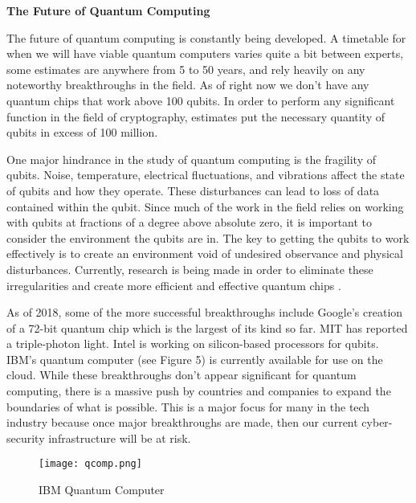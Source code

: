 \documentclass[12pt]{article}
\begin{document}
	\par\vspace{1mm}
	
\begin{center}
	{\large \bf The Future of Quantum Computing}
\end{center}

The future of quantum computing is constantly being developed. A timetable for when we will have viable quantum computers varies quite a bit between experts, some estimates are anywhere from 5 to 50 years\cite{osa}\cite{sa}, and rely heavily on any noteworthy breakthroughs in the field. As of right now we don't have any quantum chips that work above 100 qubits. In order to perform any significant function in the field of cryptography, estimates put the necessary quantity of qubits in excess of 100 million\cite{shor}\cite{osa}.
 

One major hindrance in the study of quantum computing is the fragility of qubits. Noise, temperature, electrical fluctuations, and vibrations affect the state of qubits and how they operate. These disturbances can lead to loss of data contained within the qubit. Since much of the work in the field relies on working with qubits at fractions of a degree above absolute zero, it is important to consider the environment the qubits are in. The key to getting the qubits to work effectively is to create an environment void of undesired observance and physical disturbances. Currently, research is being made in order to eliminate these irregularities and create more efficient and effective quantum chips \cite{sa}.

As of 2018, some of the more successful breakthroughs include Google's creation of a 72-bit quantum chip which is the largest of its kind so far. MIT has reported a triple-photon light. Intel is working on silicon-based processors for qubits\cite{time}. IBM's quantum computer (see Figure 5) is currently available for use on the cloud. While these breakthroughs don't appear significant for quantum computing, there is a massive push by countries and companies to expand the boundaries of what is possible. This is a major focus for many in the tech industry because once major breakthroughs are made, then our current cyber-security infrastructure will be at risk.
\newpage
\begin{figure}[h]
\caption{IBM Quantum Computer}
\centering
\texttt{[image: qcomp.png]}
\end{figure}
\end{document}
